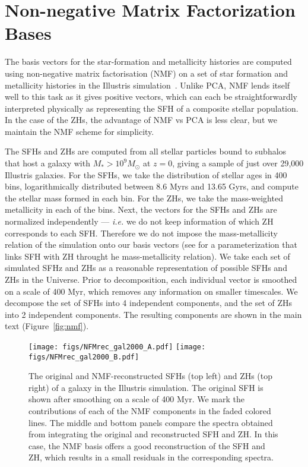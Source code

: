 \section{Non-negative Matrix Factorization Bases} \label{sec:nmf}
The basis vectors for the star-formation and metallicity histories are computed
using non-negative matrix factorisation (NMF) on a set of star formation and
metallicity histories in the Illustris 
simulation~\citep{vogelsberger2014, genel2014, nelson2015}.
Unlike PCA, NMF lends itself well to this task as it gives positive vectors,
which can each be straightforwardly interpreted physically as representing the
SFH of a composite stellar population. 
In the case of the ZHs, the advantage of NMF vs PCA is less clear, but we
maintain the NMF scheme for simplicity. 

The SFHs and ZHs are computed from all stellar particles bound to subhalos
that host a galaxy with $M_* > 10^9 M_\odot$ at $z=0$, giving a sample of just
over 29,000 Illustris galaxies. 
For the SFHs, we take the distribution of stellar ages in 400 bins,
logarithmically distributed between 8.6 Myrs and 13.65 Gyrs, and compute the
stellar mass formed in each bin. For the ZHs, we take the mass-weighted
metallicity in each of the bins. 
Next, the vectors for the SFHs and ZHs are normalized independently ---
\emph{i.e.} we do not keep information of which ZH corresponds to each SFH.
Therefore we do not impose the mass-metallicity relation of the simulation onto
our basis vectors (see \citealt{thorne2021} for a parameterization that links
SFH with ZH throught he mass-metallicity relation). 
We take each set of simulated SFHz and ZHs as a reasonable representation of
possible SFHs and ZHs in the Universe. 
Prior to decomposition, each individual vector is smoothed on a scale of 400
Myr, which removes any information on smaller timescales. 
We decompose the set of SFHs into 4 independent components, and the set of ZHs
into 2 independent components. 
The resulting components are shown in the main text (Figure~\ref{fig:nmf}). 

\begin{figure}
\begin{center}
\texttt{[image: figs/NFMrec\_gal2000\_A.pdf]}
\texttt{[image: figs/NFMrec\_gal2000\_B.pdf]}
    \caption{
    The original and NMF-reconstructed SFHs (top left) and ZHs (top right) of a
    galaxy in the Illustris simulation. 
    The original SFH is shown after smoothing on a scale of 400 Myr. 
    We mark the contributions of each of the NMF components in the faded
    colored lines. 
    The middle and bottom panels compare the spectra obtained from integrating
    the original and reconstructed SFH and ZH. 
    In this case, the NMF basis offers a good reconstruction of the SFH and ZH,
    which results in a small residuals in the corresponding spectra.
    }\label{fig:nmf0}
\end{center}
\end{figure}

